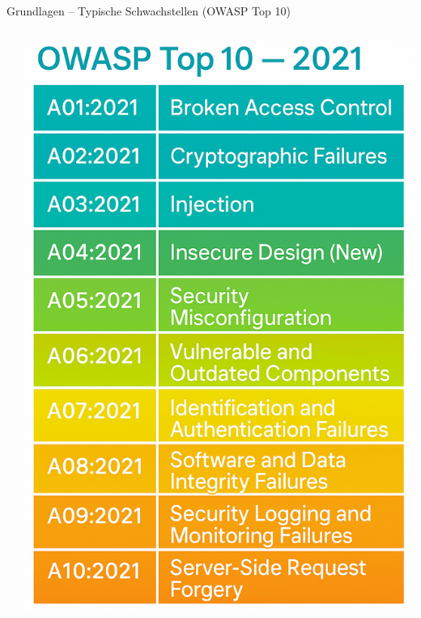 \documentclass[
	aspectratio=169,	%
	onlytextwidth,		%
	t,					%
	]{beamer}
\begin{document}
\begin{frame}{Grundlagen – Typische Schwachstellen (OWASP Top 10)}
\begin{columns}
\begin{column}[T]{.65\textwidth}
		\end{column}
		\begin{column}[T]{.3\textwidth}
			\vspace*{-4mm}
			\centering
			\includegraphics[width=\textwidth]{figures/4.png}
			\label{fig:4}
		\end{column}
	\end{columns}
\end{frame}
\end{document}
